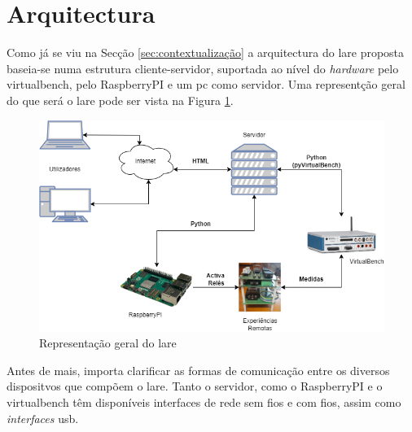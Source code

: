 \section{Arquitectura}
\label{sec:arquitectura}
Como já se viu na Secção \ref{sec:contextualização} a arquitectura do \acrshort{lare} proposta baseia-se numa estrutura cliente-servidor, suportada ao nível do \textit{hardware} pelo \acrshort{virtualbench}, pelo \gls{RaspberryPI} e um \acrshort{pc} como servidor. Uma representção geral do que será o \acrshort{lare} pode ser vista na Figura \ref{fig:representaçãogerallare}.

\begin{figure}[hbtp]
    \centering
    \includegraphics[width=1\textwidth]{figures/arquitectura_ver2.drawio.png}
    \caption{Representação geral do \acrshort{lare}}
    \label{fig:representaçãogerallare}
\end{figure}

Antes de mais, importa clarificar as formas de comunicação entre os diversos dispositvos que compõem o \acrshort{lare}. Tanto o servidor, como o \gls{RaspberryPI} e o \acrshort{virtualbench} têm disponíveis interfaces de rede sem fios e com fios, assim como \textit{interfaces} \acrshort{usb}.


